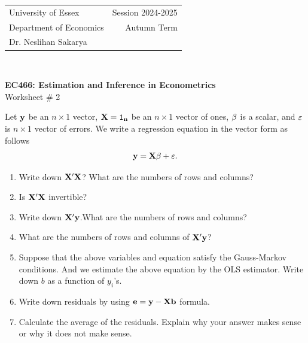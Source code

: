 \documentclass[12pt,a4paper]{article}
\newcommand{\by}{\bf{y}}
\newcommand{\bX}{\bf{X}}
\newcommand{\be}{\bf{e}}
\newcommand{\beps}{\bf{\varepsilon}}
\newcommand{\bbeta}{\bf{\beta}}
\begin{document}
\begin{tabular}{l r}
University of Essex  \hspace{35ex}& Session 2024-2025 \\
Department of Economics \hspace{35ex} & Autumn Term\\
Dr. Neslihan Sakarya \hspace{35ex} &
\end{tabular}
\\
\begin{center}
\large{\textbf{EC466: Estimation and Inference in Econometrics}\\
Worksheet \# 2}
\end{center}
\vspace*{0.5cm}
Let $\by$ be an $n \times 1$ vector, $\bX=\mathtt{1}_{n}$ be an $n \times 1$ vector of ones, $\bbeta$ is a scalar, and $\beps$ is $n \times 1$ vector of errors.  We write a regression equation in the vector form as follows
\begin{align*}
\by=\bX\beta+\beps.
\end{align*}
\begin{enumerate}
\item{Write down $\bX'\bX$? What are the numbers of rows and columns?}
\item{Is $\bX'\bX$ invertible?}
\item{Write down $\bX'\by$.What are the numbers of rows and columns?}
\item{What are the numbers of rows and columns of $\bX'\by$?}
\item{Suppose that the above variables and equation satisfy the Gauss-Markov conditions. And we estimate the above equation by the OLS estimator. Write down $b$ as a function of $y_{i}$'s. }
\item{Write down residuals by using $\be=\by-\bX b$ formula.}
\item{Calculate the average of the residuals. Explain why your answer makes sense or why it does not make sense.}
\end{enumerate}
\end{document}
